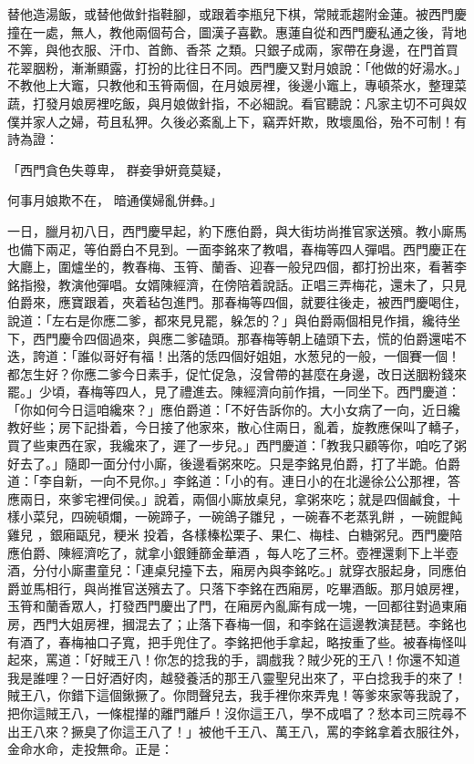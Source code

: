 替他造湯飯，或替他做針指鞋腳，或跟着李瓶兒下棋，常賊乖趨附金蓮。被西門慶撞在一處，無人，教他兩個苟合，圖漢子喜歡。惠蓮自從和西門慶私通之後，背地不筭，與他衣服、汗巾、首飾、香茶 之類。只銀子成兩，家帶在身邊，在門首買花翠胭粉，漸漸顯露，打扮的比往日不同。西門慶又對月娘說：「他做的好湯水。」不教他上大竈，只教他和玉筲兩個，在月娘房裡，後邊小竈上，專頓茶水，整理菜蔬，打發月娘房裡吃飯，與月娘做針指，不必細說。看官聽說：凡家主切不可與奴僕并家人之婦，苟且私狎。久後必紊亂上下，竊弄奸欺，敗壞風俗，殆不可制！有詩為證：

「西門貪色失尊卑，  群妾爭妍竟莫疑，

何事月娘欺不在，  暗通僕婦亂併彝。」

一日，臘月初八日，西門慶早起，約下應伯爵，與大街坊尚推官家送殯。教小廝馬也備下兩疋，等伯爵白不見到。一面李銘來了教唱，春梅等四人彈唱。西門慶正在大廳上，圍爐坐的，教春梅、玉筲、蘭香、迎春一般兒四個，都打扮出來，看著李銘指撥，教演他彈唱。女婿陳經濟，在傍陪着說話。正唱三弄梅花，還未了，只見伯爵來，應寶跟着，夾着毡包進門。那春梅等四個，就要往後走，被西門慶喝住，說道：「左右是你應二爹，都來見見罷，躲怎的？」與伯爵兩個相見作揖，纔待坐下，西門慶令四個過來，與應二爹磕頭。那春梅等朝上磕頭下去，慌的伯爵還喏不迭，誇道：「誰似哥好有福！出落的恁四個好姐姐，水葱兒的一般，一個賽一個！都怎生好？你應二爹今日素手，促忙促急，沒曾帶的甚麼在身邊，改日送胭粉錢來罷。」少頃，春梅等四人，見了禮進去。陳經濟向前作揖，一同坐下。西門慶道：「你如何今日這咱纔來？」應伯爵道：「不好告訴你的。大小女病了一向，近日纔教好些；房下記掛着，今日接了他家來，散心住兩日，亂着，旋教應保叫了轎子，買了些東西在家，我纔來了，遲了一步兒。」西門慶道：「教我只顧等你，咱吃了粥好去了。」隨即一面分付小廝，後邊看粥來吃。只是李銘見伯爵，打了半跪。伯爵道：「李自新，一向不見你。」李銘道：「小的有。連日小的在北邊徐公公那裡，答應兩日，來爹宅裡伺侯。」說着，兩個小廝放桌兒，拿粥來吃；就是四個鹹食，十樣小菜兒，四碗頓爛，一碗蹄子，一碗鴿子雛兒 ，一碗春不老蒸乳餅 ，一碗餛飩雞兒 ，銀廂甌兒，粳米 投着，各樣榛松栗子、果仁、梅桂、白糖粥兒。西門慶陪應伯爵、陳經濟吃了，就拿小銀鍾篩金華酒 ，每人吃了三杯。壺裡還剩下上半壺酒，分付小廝畫童兒：「連桌兒擡下去，廂房內與李銘吃。」就穿衣服起身，同應伯爵並馬相行，與尚推官送殯去了。只落下李銘在西廂房，吃畢酒飯。那月娘房裡，玉筲和蘭香眾人，打發西門慶出了門，在廂房內亂廝有成一塊，一回都往對過東廂房，西門大姐房裡，摑混去了；止落下春梅一個，和李銘在這邊教演琵琶。李銘也有酒了，春梅袖口子寬，把手兜住了。李銘把他手拿起，略按重了些。被春梅怪叫起來，罵道：「好賊王八！你怎的捻我的手，調戲我？賊少死的王八！你還不知道我是誰哩？一日好酒好肉，越發養活的那王八靈聖兒出來了，平白捻我手的來了！賊王八，你錯下這個鍬撅了。你問聲兒去，我手裡你來弄鬼！等爹來家等我說了，把你這賊王八，一條棍攆的離門離戶！沒你這王八，學不成唱了？愁本司三院尋不出王八來？撅臭了你這王八了！」被他千王八、萬王八，罵的李銘拿着衣服往外，金命水命，走投無命。正是：

